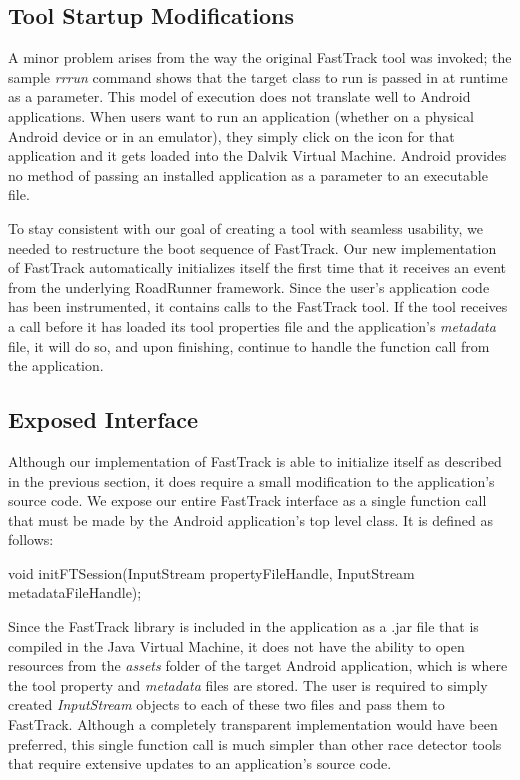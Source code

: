 \documentclass{acm_proc_article-sp}
\begin{document}
\subsection{Tool Startup Modifications}
A minor problem arises from the way the original FastTrack tool was invoked; the sample \emph{rrrun} command shows that the target class to run is passed in at runtime as a parameter. This model of execution does not translate well to Android applications. When users want to run an application (whether on a physical Android device or in an emulator), they simply click on the icon for that application and it gets loaded into the Dalvik Virtual Machine. Android provides no method of passing an installed application as a parameter to an executable file.

To stay consistent with our goal of creating a tool with seamless usability, we needed to restructure the boot sequence of FastTrack. Our new implementation of FastTrack automatically initializes itself the first time that it receives an event from the underlying RoadRunner framework. Since the user's application code has been instrumented, it contains calls to the FastTrack tool. If the tool receives a call before it has loaded its tool properties file and the application's \emph{metadata} file, it will do so, and upon finishing, continue to handle the function call from the application. 

\subsection{Exposed Interface}
Although our implementation of FastTrack is able to initialize itself as described in the previous section, it does require a small modification to the application's source code. We expose our entire FastTrack interface as a single function call that must be made by the Android application's top level class. It is defined as follows:

\begin{code}
void initFTSession(InputStream propertyFileHandle,
	           InputStream metadataFileHandle);
\end{code}

Since the FastTrack library is included in the application as a .jar file that is compiled in the Java Virtual Machine, it does not have the ability to open resources from the \emph{assets} folder of the target Android application, which is where the tool property and \emph{metadata} files are stored. The user is required to simply created \emph{InputStream} objects to each of these two files and pass them to FastTrack. Although a completely transparent implementation would have been preferred, this single function call is much simpler than other race detector tools that require extensive updates to an application's source code.
\end{document}
